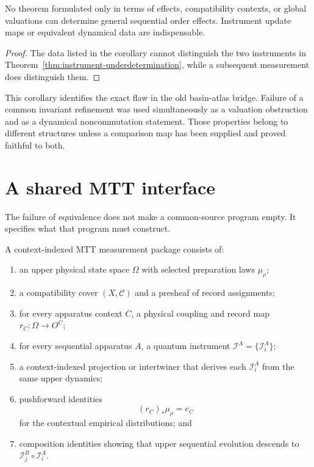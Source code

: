 \documentclass[11pt]{article}
\newcommand{\cI}{\mathcal{I}}
\newcommand{\cC}{\mathcal{C}}
\begin{document}
\begin{corollary}
\label{cor:no-bare-bridge}
No theorem formulated only in terms of effects, compatibility contexts, or
global valuations can determine general sequential order effects. Instrument
update maps or equivalent dynamical data are indispensable.
\end{corollary}

\begin{proof}
The data listed in the corollary cannot distinguish the two instruments in
Theorem~\ref{thm:instrument-underdetermination}, while a subsequent
measurement does distinguish them.
\end{proof}

This corollary identifies the exact flaw in the old basin-atlas bridge. Failure
of a common invariant refinement was used simultaneously as a valuation
obstruction and as a dynamical noncommutation statement. Those properties
belong to different structures unless a comparison map has been supplied and
proved faithful to both.

\section{A shared MTT interface}

The failure of equivalence does not make a common-source program empty. It
specifies what that program must construct.

\begin{definition}
A context-indexed MTT measurement package consists of:
\begin{enumerate}
\item an upper physical state space \(\Omega\) with selected preparation laws
\(\mu_\rho\);
\item a compatibility cover \((X,\cC)\) and a presheaf of record assignments;
\item for every apparatus context \(C\), a physical coupling and record map
\(r_C:\Omega\to O^C\);
\item for every sequential apparatus \(A\), a quantum instrument
\(\cI^A=\{\cI_i^A\}\);
\item a context-indexed projection or intertwiner that derives each
\(\cI_i^A\) from the same upper dynamics;
\item pushforward identities
\[
(r_C)_*\mu_\rho=e_C
\]
for the contextual empirical distributions; and
\item composition identities showing that upper sequential evolution
descends to
\(\cI_j^B\circ\cI_i^A\).
\end{enumerate}
\end{definition}
\end{document}
